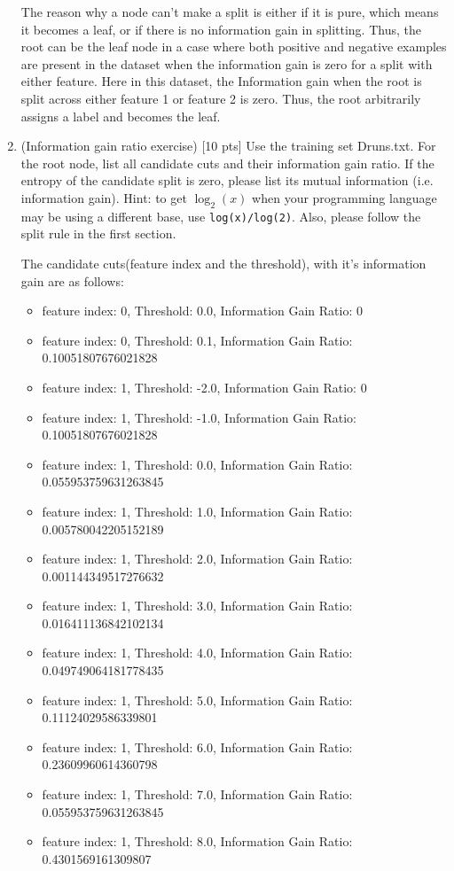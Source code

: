 \documentclass[a4paper]{article}
\theoremstyle{definition}
\newenvironment{soln}{
    \leavevmode\color{blue}\ignorespaces
}{}
\begin{document}
\begin{enumerate}
\begin{soln}
The reason why a node can't make a split is either if it is pure, which means it becomes a leaf, or if there is no information gain in splitting. Thus, the root can be the leaf node in a case where both positive and negative examples are present in the dataset when the information gain is zero for a split with either feature. Here in this dataset, the Information gain when the root is split across either feature 1 or feature 2 is zero. Thus, the root arbitrarily assigns a label and becomes the leaf.
\end{soln}

\item (Information gain ratio exercise)  [10 pts] Use the training set Druns.txt.  For the root node, list all candidate cuts and their information gain ratio. If the entropy of the candidate split is zero, please list its mutual information (i.e. information gain). Hint: to get $\log_2(x)$ when your programming language may be using a different base, use \verb|log(x)/log(2)|. Also, please follow the split rule in the first section. \\

\begin{soln}
The candidate cuts(feature index and the threshold), with it's information gain are as follows:
\begin{itemize}
    \item feature index: 0, Threshold: 0.0, Information Gain Ratio: 0
    \item feature index: 0, Threshold: 0.1, Information Gain Ratio: 0.10051807676021828
    \item feature index: 1, Threshold: -2.0, Information Gain Ratio: 0
    \item feature index: 1, Threshold: -1.0, Information Gain Ratio: 0.10051807676021828
    \item feature index: 1, Threshold: 0.0, Information Gain Ratio: 0.055953759631263845
    \item feature index: 1, Threshold: 1.0, Information Gain Ratio: 0.005780042205152189
    \item feature index: 1, Threshold: 2.0, Information Gain Ratio: 0.001144349517276632
    \item feature index: 1, Threshold: 3.0, Information Gain Ratio: 0.016411136842102134
    \item feature index: 1, Threshold: 4.0, Information Gain Ratio: 0.049749064181778435
     \item feature index: 1, Threshold: 5.0, Information Gain Ratio: 0.11124029586339801
     \item feature index: 1, Threshold: 6.0, Information Gain Ratio: 0.23609960614360798
     \item feature index: 1, Threshold: 7.0, Information Gain Ratio: 0.055953759631263845
     \item feature index: 1, Threshold: 8.0, Information Gain Ratio: 0.4301569161309807
\end{itemize}
    


\end{soln}
\end{enumerate}
\end{document}
